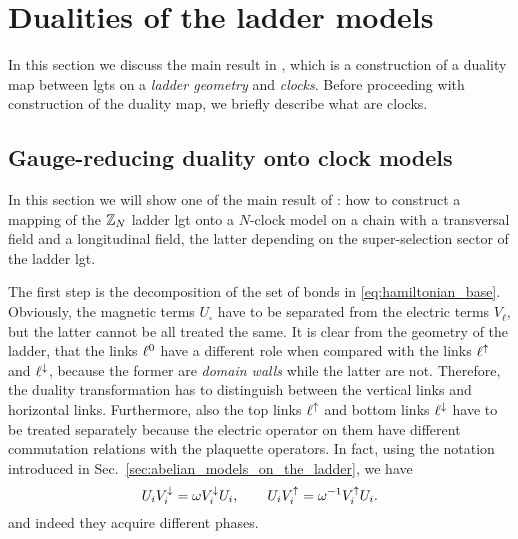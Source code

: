 \section{Dualities of the ladder models}%
\label{sec:dualities_of_the_ladder}

In this section we discuss the main result in \cite{pradhan2022ladder}, which is a construction of a duality map between \acp{lgt} on a \emph{ladder geometry} and \emph{\aclp{clock}}.
Before proceeding with construction of the duality map, we briefly describe what are \acp{clock}.


%
%



\subsection{Gauge-reducing duality onto clock models}
\label{sub:duality_onto_clock_models}

In this section we will show one of the main result of \cite{pradhan2022ladder}: how to construct a mapping of the $\mathbb{Z}_N$ ladder \ac{lgt} onto a $N$-clock model on a chain with a transversal field and a longitudinal field, the latter depending on the super-selection sector of the ladder \ac{lgt}.

The first step is the decomposition of the set of bonds in \eqref{eq:hamiltonian_base}.
Obviously, the magnetic terms $U_{\square}$ have to be separated from the electric terms $V_\ell$, but the latter cannot be all treated the same.
It is clear from the geometry of the ladder, that the links $\ell^0$ have a different role when compared with the links $\ell^\uparrow$ and $\ell^\downarrow$, because the former are \emph{domain walls} while the latter are not.
Therefore, the duality transformation has to distinguish between the vertical links and horizontal links.
Furthermore, also the top links $\ell^\uparrow$ and bottom links $\ell^\downarrow$ have to be treated separately because the electric operator on them have different commutation relations with the plaquette operators.
In fact, using the notation introduced in Sec.~\ref{sec:abelian_models_on_the_ladder}, we have
\begin{equation}
    U_i V^{\downarrow}_i = \omega V^{\downarrow}_i U_i, \qquad
    U_i V^{\uparrow}_i = \omega^{-1} V^{\uparrow}_i U_i.
    \label{eq:comm_rel_ladder}
\end{equation}
and indeed they acquire different phases.

